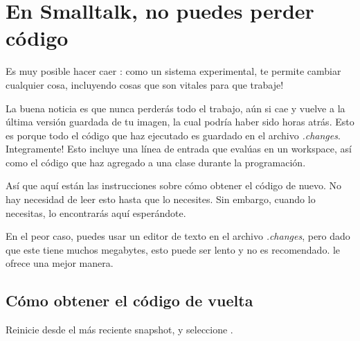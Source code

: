 \documentclass[spanish,a4paper,10pt,twoside]{book}
\begin{document}

\section{En Smalltalk, no puedes perder c\'odigo}

Es muy posible hacer caer \pharo: como un sistema experimental, \pharo te permite cambiar cualquier cosa, incluyendo cosas que son vitales para que \pharo trabaje!


La buena noticia es que nunca perder\'as todo el trabajo, a\'un si cae y vuelve a la \'ultima versi\'on guardada de tu imagen, la cual podr\'ia haber sido horas atr\'as.
Esto es porque todo el c\'odigo que haz ejecutado es guardado en el archivo \emph{.changes}.
Integramente!
Esto incluye una l\'inea de entrada que eval\'uas en un workspace, as\'i como el c\'odigo que haz agregado a una clase durante la programaci\'on.

As\'i que aqu\'i est\'an las instrucciones sobre c\'omo obtener el c\'odigo de nuevo.
No hay necesidad de leer esto hasta que lo necesites.
Sin embargo, cuando lo necesitas, lo encontrar\'as aqu\'i esper\'andote.

En el peor caso, puedes usar un editor de texto en el archivo \emph{.changes}, pero dado que este tiene muchos megabytes, esto puede ser lento y no es recomendado.
\pharo le ofrece una mejor manera.

\subsection{C\'omo obtener el c\'odigo de vuelta}
Reinicie \pharo desde el m\'as reciente snapshot, y seleccione .




\end{document}
